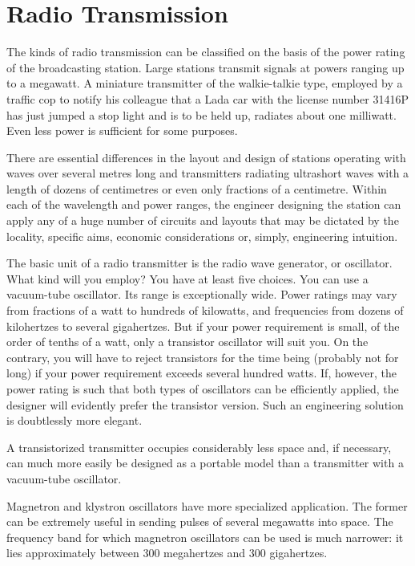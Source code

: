 \section{Radio Transmission}

The kinds of radio transmission can be classified on the basis of the power rating of the broadcasting station. Large stations transmit signals at powers ranging up to a megawatt. A miniature transmitter of the walkie-talkie type, employed by a traffic cop to notify his colleague that a Lada car with the license number 31416P has just jumped a stop light and is to be held up, radiates about one milliwatt. Even less power is sufficient for some purposes.

There are essential differences in the layout and design of stations operating with waves over several metres long and transmitters radiating ultrashort waves with a length of dozens of centimetres or even only fractions of a centimetre. Within each of the wavelength and power ranges, the engineer designing the station can apply any of a huge number of circuits and layouts that may be dictated by the locality, specific aims, economic considerations or, simply, engineering intuition.

The basic unit of a radio transmitter is the radio wave generator, or oscillator. What kind will you employ? You have at least five choices. You can use a vacuum-tube oscillator. Its range is exceptionally wide. Power ratings may vary from fractions of a watt to hundreds of kilowatts, and frequencies from dozens of kilohertzes to several gigahertzes. But if your power requirement is small, of the order of tenths of a watt, only a transistor oscillator will suit you. On the contrary, you will have to reject transistors for the time being (probably not for long) if your power requirement exceeds several hundred watts. If, however, the power rating is such that both types of oscillators can be efficiently applied, the designer will evidently prefer the transistor version. Such an engineering solution is doubtlessly more elegant.

A transistorized transmitter occupies considerably less space and, if necessary, can much more easily be designed as a portable model than a transmitter with a vacuum-tube oscillator.

Magnetron and klystron oscillators have more specialized application. The former can be extremely useful in sending pulses of several megawatts into space. The frequency band for which magnetron oscillators can be used is much narrower: it lies approximately between 300 megahertzes and 300 gigahertzes.

